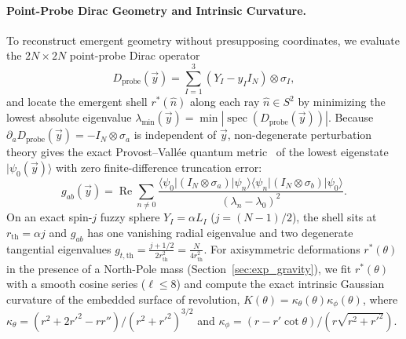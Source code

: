 \documentclass[11pt,a4paper]{article}
\DeclareMathOperator{\spec}{spec}
\begin{document}
\paragraph{Point-Probe Dirac Geometry and Intrinsic Curvature.}
To reconstruct emergent geometry without presupposing coordinates, we evaluate the $2N\times 2N$ point-probe Dirac operator~\cite{Berenstein2012}
\begin{equation}
  D_{\mathrm{probe}}(\vec{y}) = \sum_{I=1}^{3} (Y_I - y_I I_N) \otimes \sigma_I,
  \label{eq:Dprobe}
\end{equation}
and locate the emergent shell $r^*(\hat{n})$ along each ray $\hat{n}\in S^2$ by minimizing the lowest absolute eigenvalue $\lambda_{\min}(\vec{y}) = \min|\spec(D_{\mathrm{probe}}(\vec{y}))|$. Because $\partial_a D_{\mathrm{probe}}(\vec{y}) = -I_N\otimes \sigma_a$ is independent of $\vec{y}$, non-degenerate perturbation theory gives the exact Provost--Vall\'ee quantum metric~\cite{Provost1980} of the lowest eigenstate $|\psi_0(\vec{y})\rangle$ with zero finite-difference truncation error:
\begin{equation}
  g_{ab}(\vec{y}) = \operatorname{Re}\!\sum_{n \neq 0}
  \frac{\langle \psi_0 | (I_N\otimes\sigma_a) | \psi_n \rangle \langle \psi_n | (I_N\otimes\sigma_b) | \psi_0 \rangle}{(\lambda_n - \lambda_0)^2}.
  \label{eq:pv_exact}
\end{equation}
On an exact spin-$j$ fuzzy sphere $Y_I = \alpha L_I$ ($j=(N-1)/2$), the shell sits at $r_{\mathrm{th}} = \alpha j$ and $g_{ab}$ has one vanishing radial eigenvalue and two degenerate tangential eigenvalues $g_{t,\mathrm{th}} = \frac{j+1/2}{2 r_{\mathrm{th}}^2} = \frac{N}{4 r_{\mathrm{th}}^2}$. For axisymmetric deformations $r^*(\theta)$ in the presence of a North-Pole mass (Section~\ref{sec:exp_gravity}), we fit $r^*(\theta)$ with a smooth cosine series ($\ell \le 8$) and compute the exact intrinsic Gaussian curvature of the embedded surface of revolution, $K(\theta) = \kappa_\theta(\theta)\kappa_\phi(\theta)$, where $\kappa_\theta = (r^2 + 2r'^2 - r r'')/(r^2+r'^2)^{3/2}$ and $\kappa_\phi = (r - r'\cot\theta)/(r\sqrt{r^2+r'^2})$.
\end{document}
